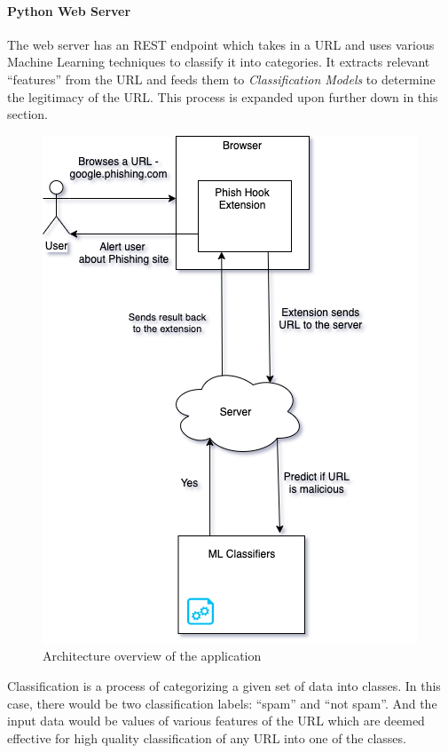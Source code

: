 \documentclass[conference]{IEEEtran}
\begin{document}
\paragraph{Python Web Server}
The web server has an REST endpoint which takes in a URL and uses various Machine Learning techniques to classify it into categories.
It extracts relevant ``features'' from the URL and feeds them to \emph{Classification Models} to determine the legitimacy of the URL.
This process is expanded upon further down in this section.

\begin{figure}[htbp]
    \centerline{\includegraphics[scale=.5]{phish-arch.png}}
    \caption{Architecture overview of the application}
    \label{fig}
\end{figure}

\par Classification is a process of categorizing a given set of data into classes.
In this case, there would be two classification labels: ``spam'' and ``not spam''.
And the input data would be values of various features of the URL which are deemed effective for high quality classification of any URL into one of the classes.
\end{document}
